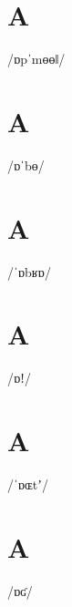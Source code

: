 \documentclass[10pt,a4paper,twoside]{book}
\begin{document}
\section*{A}

\begin{multicols}{3}
 {/ɒpˈmɵɵǁ/} {}
\end{multicols}

\section*{A}

\begin{multicols}{3}
 {/ɒˈbɵ/} {}
\end{multicols}

\section*{A}

\begin{multicols}{3}
 {/ˈɒbʁɒ/} {}
\end{multicols}

\section*{A}

\begin{multicols}{3}
 {/ɒǃ/} {}
\end{multicols}

\section*{A}

\begin{multicols}{3}
 {/ˈɒɶtʼ/} {}
\end{multicols}

\section*{A}

\begin{multicols}{3}
 {/ɒʛ/} {}
\end{multicols}
\end{document}
